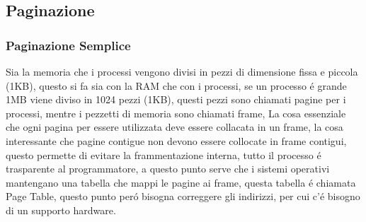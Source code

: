     \subsection{Paginazione}
    \subsubsection*{Paginazione Semplice}
    Sia la memoria che i processi vengono divisi in pezzi di dimensione fissa e piccola (1KB), questo si fa sia
    con la RAM che con i processi, se un processo é grande 1MB viene diviso in 1024 pezzi (1KB), questi pezzi
    sono chiamati pagine per i processi, mentre i pezzetti di memoria sono chiamati frame, La cosa essenziale
    che ogni pagina per essere utilizzata deve essere collacata in un frame, la cosa interessante che pagine
    contigue non devono essere collocate in frame contigui, questo permette di evitare la frammentazione interna,
    tutto il processo é trasparente al programmatore, a questo punto serve che i sistemi operativi mantengano
    una tabella che mappi le pagine ai frame, questa tabella é chiamata Page Table, questo punto peró bisogna
    correggere gli indirizzi, per cui c'é bisogno di un supporto hardware.
